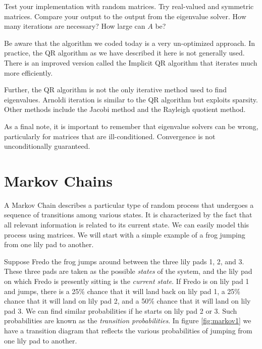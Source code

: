 \begin{problem}
Test your implementation with random matrices.
Try real-valued and symmetric matrices.
Compare your output to the output from the eigenvalue solver.
How many iterations are necessary?
How large can $A$ be?
\end{problem}

Be aware that the algorithm we coded today is a very un-optimized approach.
In practice, the QR algorithm as we have described it here is not generally used.
There is an improved version called the Implicit QR algorithm that iterates much more efficiently.

Further, the QR algorithm is not the only iterative method used to find eigenvalues.
Arnoldi iteration is similar to the QR algorithm but exploits sparsity.
Other methods include the Jacobi method and the Rayleigh quotient method.

As a final note, it is important to remember that eigenvalue solvers can be wrong, particularly for matrices that are ill-conditioned. Convergence is not unconditionally guaranteed. 

\section*{Markov Chains}
A Markov Chain describes a particular type of random process that
undergoes a sequence of transitions among various states. It is
characterized by the fact that all relevant information is related to its current state.
We can easily model this process using matrices.
We will start with a simple example of a frog jumping from one lily pad to another.

Suppose Fredo the frog jumps around between the three lily pads 1, 2, and 3.
These three pads are taken as the possible \emph{states} of the system, and the
lily pad on which Fredo is presently sitting is the \emph{current state}.
If Fredo is on lily pad 1 and jumps, there is a 25\% chance that it will land back on lily pad 1, a 25\% chance that it will land on lily pad 2, and a 50\% chance that it will land on lily pad 3.
We can find similar probabilities if he starts on lily pad 2 or 3.
Such probabilities are known as the \emph{transition probabilities}.
In figure \ref{fig:markov1} we have a transition diagram that reflects the various probabilities of jumping from one lily pad to another.

